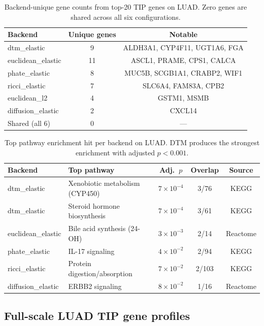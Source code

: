 \documentclass[11pt]{article}
\begin{document}
\begin{table}[h]
\centering\small
\begin{tabular}{lcc}
\toprule
\textbf{Backend} & \textbf{Unique genes} & \textbf{Notable} \\
\midrule
dtm\_elastic & 9 & ALDH3A1, CYP4F11, UGT1A6, FGA \\
euclidean\_elastic & 11 & ASCL1, PRAME, CPS1, CALCA \\
phate\_elastic & 8 & MUC5B, SCGB1A1, CRABP2, WIF1 \\
ricci\_elastic & 7 & SLC6A4, FAM83A, CPB2 \\
euclidean\_l2 & 4 & GSTM1, MSMB \\
diffusion\_elastic & 2 & CXCL14 \\
\midrule
Shared (all 6) & 0 & --- \\
\bottomrule
\end{tabular}
\caption{Backend-unique gene counts from top-20 TIP genes on LUAD. Zero genes are shared across all six configurations.}
\label{tab:geneoverlap}
\end{table}

\begin{table}[h]
\centering\small
\begin{tabular}{llccc}
\toprule
\textbf{Backend} & \textbf{Top pathway} & \textbf{Adj.\ $p$} & \textbf{Overlap} & \textbf{Source} \\
\midrule
dtm\_elastic & Xenobiotic metabolism (CYP450) & $7 \times 10^{-4}$ & 3/76 & KEGG \\
dtm\_elastic & Steroid hormone biosynthesis & $7 \times 10^{-4}$ & 3/61 & KEGG \\
euclidean\_elastic & Bile acid synthesis (24-OH) & $3 \times 10^{-3}$ & 2/14 & Reactome \\
phate\_elastic & IL-17 signaling & $4 \times 10^{-2}$ & 2/94 & KEGG \\
ricci\_elastic & Protein digestion/absorption & $7 \times 10^{-2}$ & 2/103 & KEGG \\
diffusion\_elastic & ERBB2 signaling & $8 \times 10^{-2}$ & 1/16 & Reactome \\
\bottomrule
\end{tabular}
\caption{Top pathway enrichment hit per backend on LUAD. DTM produces the strongest enrichment with adjusted $p < 0.001$.}
\label{tab:enrichment}
\end{table}

\subsection{Full-scale LUAD TIP gene profiles}
\label{sec:fullscale_genes}
\end{document}
